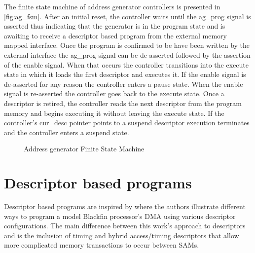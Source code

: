 The finite state machine of address generator controllers is presented in
\autoref{fig:ag_fsm}. After an initial reset, the controller waits until the
ag\_prog signal is asserted thus indicating that the generator is in the program
state and is awaiting to receive a descriptor based program from the external
memory mapped interface. Once the program is confirmed to be have been written
by the external interface the ag\_prog signal can be de-asserted followed by the
assertion of the enable signal. When that occurs the controller transitions into
the execute state in which it loads the first descriptor and executes it. If the
enable signal is de-asserted for any reason the controller enters a pause state.
When the enable signal is re-asserted the controller goes back to the execute
state. Once a descriptor is retired, the controller reads the next descriptor
from the program memory and begins executing it without leaving the execute
state. If the controller's cur\_desc pointer points to a suspend descriptor
execution terminates and the controller enters a suspend state.

\begin{figure}
    \centering
    \caption{Address generator Finite State Machine}
    \label{fig:ag_fsm}
\end{figure}

\section{Descriptor based programs}
\label{chap:data_orchestration:sams:programs}

Descriptor based programs are inspired by \cite{2d_dma_book} where the authors
illustrate different ways to program a model Blackfin processor's DMA using
various descriptor configurations. The main difference between this work's
approach to descriptors and \cite{2d_dma_book} is the inclusion of timing and
hybrid access/timing descriptors that allow more complicated memory transactions
to occur between SAMs.

